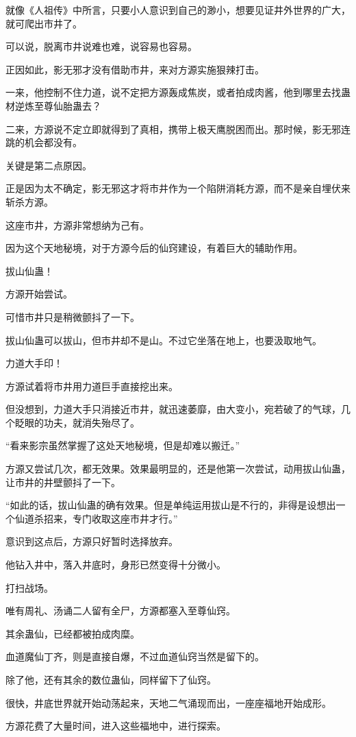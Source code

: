 \begin{this_body}
就像《人祖传》中所言，只要小人意识到自己的渺小，想要见证井外世界的广大，就可爬出市井了。

可以说，脱离市井说难也难，说容易也容易。

正因如此，影无邪才没有借助市井，来对方源实施狠辣打击。

一来，他控制不住力道，说不定把方源轰成焦炭，或者拍成肉酱，他到哪里去找蛊材逆炼至尊仙胎蛊去？

二来，方源说不定立即就得到了真相，携带上极天鹰脱困而出。那时候，影无邪连跳的机会都没有。

关键是第二点原因。

正是因为太不确定，影无邪这才将市井作为一个陷阱消耗方源，而不是亲自埋伏来斩杀方源。

这座市井，方源非常想纳为己有。

因为这个天地秘境，对于方源今后的仙窍建设，有着巨大的辅助作用。

拔山仙蛊！

方源开始尝试。

可惜市井只是稍微颤抖了一下。

拔山仙蛊可以拔山，但市井却不是山。不过它坐落在地上，也要汲取地气。

力道大手印！

方源试着将市井用力道巨手直接挖出来。

但没想到，力道大手只消接近市井，就迅速萎靡，由大变小，宛若破了的气球，几个眨眼的功夫，就消失殆尽了。

“看来影宗虽然掌握了这处天地秘境，但是却难以搬迁。”

方源又尝试几次，都无效果。效果最明显的，还是他第一次尝试，动用拔山仙蛊，让市井的井壁颤抖了一下。

“如此的话，拔山仙蛊的确有效果。但是单纯运用拔山是不行的，非得是设想出一个仙道杀招来，专门收取这座市井才行。”

意识到这点后，方源只好暂时选择放弃。

他钻入井中，落入井底时，身形已然变得十分微小。

打扫战场。

唯有周礼、汤诵二人留有全尸，方源都塞入至尊仙窍。

其余蛊仙，已经都被拍成肉糜。

血道魔仙丁齐，则是直接自爆，不过血道仙窍当然是留下的。

除了他，还有其余的数位蛊仙，同样留下了仙窍。

很快，井底世界就开始动荡起来，天地二气涌现而出，一座座福地开始成形。

方源花费了大量时间，进入这些福地中，进行探索。


\end{this_body}
